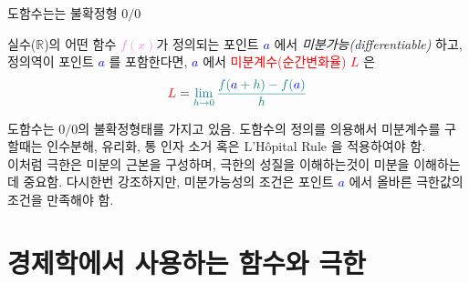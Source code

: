 \documentclass[aspectratio=169]{beamer}
\begin{document}
\begin{frame}{도함수는는 불확정형 $ 0 / 0 $}
  \begin{definition}[도함수]
    실수($\mathbb{R}$)의 어떤 함수 \textcolor{violet}{$f(x)$}가 정의되는 포인트 \textcolor{blue}{\emph{$a$}} 에서 \emph{미분가능(differentiable)} 하고, 정의역이 포인트 \textcolor{blue}{\emph{$a$}} 를 포함한다면, \textcolor{blue}{\emph{$a$}} 에서 \textcolor{red}{미분계수(순간변화율)} \textcolor{red}{\emph{$L$}} 은 \\
    \begin{equation}
      \textcolor{red}{L} = \textcolor{teal}{\lim_{h \to 0} \frac{f(\textcolor{blue}{a}+h)-f(\textcolor{blue}{a})}{h}}
    \end{equation}
  \end{definition}
  \vspace{10pt}
  도함수는 $0/0$의 불확정형태를 가지고 있음. 도함수의 정의를 의용해서 미분계수를 구할때는 인수분해, 유리화, 통 인자 소거 혹은 L'Hôpital Rule 을 적용하여야 함. \\
  이처럼 극한은 미분의 근본을 구성하며, 극한의 성질을 이해하는것이 미분을 이해하는데 중요함. 다시한번 강조하지만, 미분가능성의 조건은 포인트 \textcolor{blue}{\emph{$a$}} 에서 올바른 극한값의 조건을 만족해야 함.
\end{frame}



\section{경제학에서 사용하는 함수와 극한}
\end{document}
